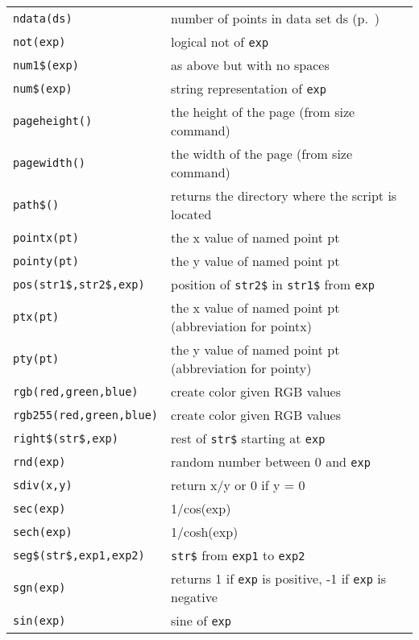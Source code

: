 \begin{supertabular}{ll}
{\tt ndata(ds)}            & number of points in data set ds (p.~\pageref{ndata})\\
{\tt not(exp)}          	& logical not of {\tt exp} \\
{\tt num1\$(exp)}    	& as above but with no spaces \\
{\tt num\$(exp)}      	& string representation of {\tt exp} \\
{\tt pageheight()}  & the height of the page (from size command) \\
{\tt pagewidth()} 	& the width of the page (from size command) \\
{\tt path\$()}          & returns the directory where the script is located \\
{\tt pointx(pt)}     	& the x value of named point pt \\
{\tt pointy(pt)}     	& the y value of named point pt \\
{\tt pos(str1\$,str2\$,exp)}      & position of {\tt str2\$} in {\tt str1\$} from {\tt exp} \\
{\tt ptx(pt)}           	& the x value of named point pt (abbreviation for pointx) \\
{\tt pty(pt)}          	& the y value of named point pt (abbreviation for pointy)\\
{\tt rgb(red,green,blue)}   & create color given RGB values \\
{\tt rgb255(red,green,blue)}   & create color given RGB values \\
{\tt right\$(str\$,exp)}      & rest of {\tt str\$} starting at {\tt exp} \\
{\tt rnd(exp)}          	& random number between 0 and {\tt exp} \\
{\tt sdiv(x,y)} 	     	& return x/y or 0 if y = 0 \\
{\tt sec(exp)} 	     	& 1/cos(exp) \\
{\tt sech(exp)}        	& 1/cosh(exp) \\
{\tt seg\$(str\$,exp1,exp2)}    & {\tt str\$} from {\tt exp1} to {\tt exp2} \\
{\tt sgn(exp)}          	& returns 1 if {\tt exp} is positive, -1 if {\tt exp} is negative \\
{\tt sin(exp)}          	& sine of {\tt exp} \\

\end{supertabular}
